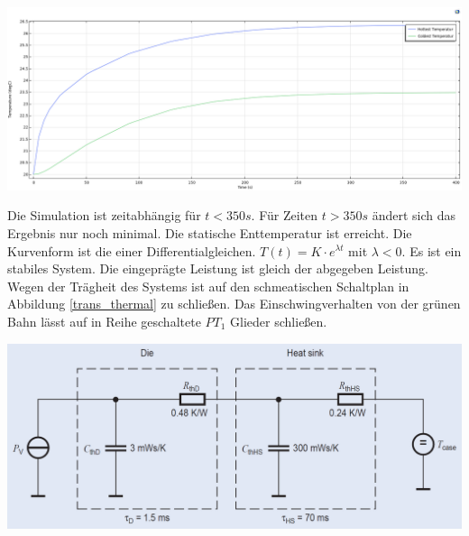 \documentclass[10pt,a4paper,oneside,abstracton]{scrartcl}
\newenvironment{Figure}
  {\par\medskip\noindent\minipage{\linewidth}}
  {\endminipage\par\medskip}
\begin{document}
\begin{multicols}{2}
\begin{Figure}
	\includegraphics[width=\textwidth]{Bilder/time_dep.png}
	\label{timedep}
\end{Figure}
\noindent
Die Simulation ist zeitabhängig für $ t < 350s $. 
Für Zeiten $ t > 350s $ ändert sich das Ergebnis nur noch minimal. 
Die statische Enttemperatur ist erreicht. 
Die Kurvenform ist die einer Differentialgleichen. $ T(t) = K \cdot e^{\lambda t} $ mit
$ \lambda  < 0$. Es ist ein stabiles System. 
Die eingeprägte Leistung ist gleich der abgegeben Leistung. 
Wegen der Trägheit des Systems ist auf den schmeatischen Schaltplan in Abbildung \ref{trans_thermal} zu schließen. 
Das Einschwingverhalten von der grünen Bahn lässt auf in Reihe geschaltete $PT_1$ Glieder schließen. 
\begin{Figure}
	\includegraphics[width=\textwidth]{Bilder/trans_thermal.png}
	\label{trans_thermal}
\end{Figure}


\end{multicols}
\end{document}
